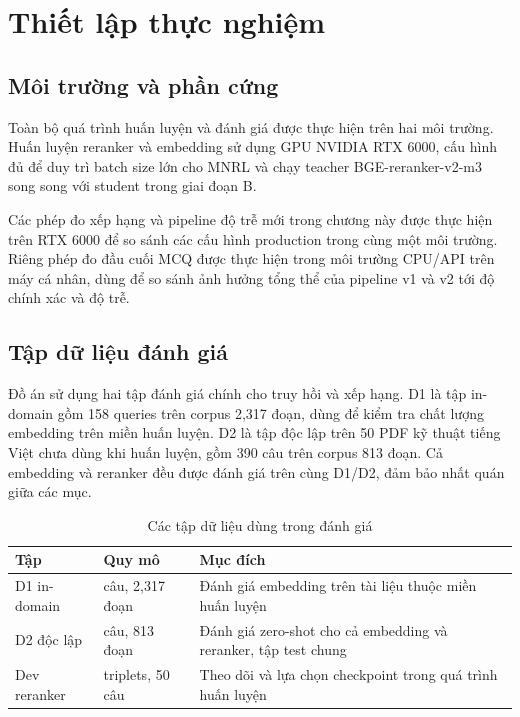 \documentclass[../DoAn.tex]{subfiles}
\begin{document}
\section{Thiết lập thực nghiệm}
\label{section:4.1}

\subsection{Môi trường và phần cứng}
\label{subsection:4.1.1}

Toàn bộ quá trình huấn luyện và đánh giá được thực hiện trên hai môi trường. Huấn luyện reranker và embedding sử dụng GPU NVIDIA RTX 6000, cấu hình đủ để duy trì batch size lớn cho MNRL và chạy teacher BGE-reranker-v2-m3 song song với student trong giai đoạn B.

Các phép đo xếp hạng và pipeline độ trễ mới trong chương này được thực hiện trên RTX 6000 để so sánh các cấu hình production trong cùng một môi trường. Riêng phép đo đầu cuối MCQ được thực hiện trong môi trường CPU/API trên máy cá nhân, dùng để so sánh ảnh hưởng tổng thể của pipeline v1 và v2 tới độ chính xác và độ trễ.

\subsection{Tập dữ liệu đánh giá}
\label{subsection:4.1.2}

Đồ án sử dụng hai tập đánh giá chính cho truy hồi và xếp hạng. D1 là tập in-domain gồm 158 queries trên corpus 2,317 đoạn, dùng để kiểm tra chất lượng embedding trên miền huấn luyện. D2 là tập độc lập trên 50 PDF kỹ thuật tiếng Việt chưa dùng khi huấn luyện, gồm 390 câu trên corpus 813 đoạn. Cả embedding và reranker đều được đánh giá trên cùng D1/D2, đảm bảo nhất quán giữa các mục.

\begin{table}[H]
    \centering
    \caption{Các tập dữ liệu dùng trong đánh giá}
    \label{tab:evaluation-datasets}
    {\small
    \setlength{\tabcolsep}{5pt}
    \begin{tabular}{|>{\raggedright\arraybackslash}p{3.2cm}|>{\raggedright\arraybackslash}p{4.1cm}|>{\raggedright\arraybackslash}p{6.0cm}|}
        \hline
        \textbf{Tập} & \textbf{Quy mô} & \textbf{Mục đích} \\ \hline
        D1 in-domain & 158 câu, 2,317 đoạn & Đánh giá embedding trên tài liệu thuộc miền huấn luyện \\ \hline
        D2 độc lập & 390 câu, 813 đoạn & Đánh giá zero-shot cho cả embedding và reranker, tập test chung \\ \hline
        Dev reranker & 305 triplets, 50 câu & Theo dõi và lựa chọn checkpoint trong quá trình huấn luyện \\ \hline
    \end{tabular}
    }
\end{table}
\end{document}
